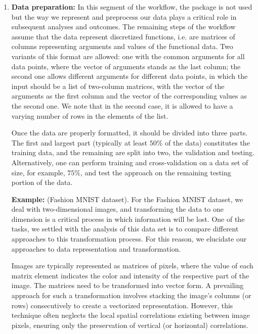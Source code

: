 \vspace{-.13cm}
\begin{enumerate}[leftmargin=0.2cm]
    \item{\bf Data preparation:} In this segment of the workflow, the package  is not used but the way we represent and preprocess our data plays a critical role in subsequent analyses and outcomes. 
    The remaining steps of the workflow assume that the data represent discretized functions, i.e. are matrices of columns representing arguments and values of the functional data. 
    Two variants of this format are allowed: one with the common arguments for all data points, where the vector of arguments stands as the last column; the second one allows different arguments for different data points, in which the input should be a list of two-column matrices, with the vector of the arguments as the first column and the vector of the corresponding values as the second one. 
    We note that in the second case, it is allowed to have a varying number of rows in the elements of the list. 

    Once the data are properly formatted, it should be divided into three parts. The first and largest part (typically at least $50\%$ of the data) constitutes the training data, and the remaining are split into two, the validation and testing. 
    Alternatively, one can perform training and cross-validation on a data set of size, for example, $75\%$, and test the approach on the remaining testing portion of the data.
    
    \noindent\textbf{Example:} (Fashion MNIST dataset).
     For the Fashion MNIST dataset, we deal with two-dimensional images, and transforming the data to one dimension is a critical process in which information will be lost. One of the tasks, we settled with the analysis of this data set is to compare different approaches to this transformation process. For this reason, we elucidate our approaches to data representation and transformation.
 
    Images are typically represented as matrices of pixels, where the value of each matrix element indicates the color and intensity of the respective part of the image.
    The matrices need to be transformed into vector form. A prevailing approach for such a transformation involves stacking the image's columns (or rows) consecutively to create a vectorized representation. However, this technique often neglects the local spatial correlations existing between image pixels, ensuring only the preservation of vertical (or horizontal) correlations.


\end{enumerate}
